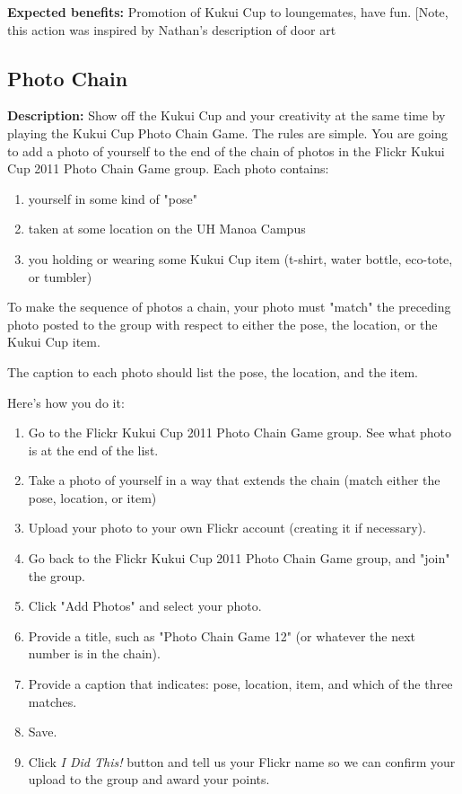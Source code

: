 \vspace{2ex}
\textbf{Expected benefits:} Promotion of Kukui Cup to loungemates, have fun. [Note, this action was inspired by Nathan's description of door art~\cite[pgs. 23--27]{Nathan2005-FreshmanYear}


\subsection{Photo Chain}

\textbf{Description:} Show off the Kukui Cup and your creativity at the same time by playing the Kukui Cup Photo Chain Game. The rules are simple. You are going to add a photo of yourself to the end of the chain of photos in the Flickr Kukui Cup 2011 Photo Chain Game group. Each photo contains:

\begin{enumerate}
	\item yourself in some kind of "pose"
	\item taken at some location on the UH Manoa Campus
	\item you holding or wearing some Kukui Cup item (t-shirt, water bottle, eco-tote, or tumbler)
\end{enumerate}

To make the sequence of photos a chain, your photo must "match" the preceding photo posted to the group with respect to either the pose, the location, or the Kukui Cup item.

The caption to each photo should list the pose, the location, and the item.

Here's how you do it:

\begin{enumerate}
	\item Go to the Flickr Kukui Cup 2011 Photo Chain Game group. See what photo is at the end of the list.
	\item Take a photo of yourself in a way that extends the chain (match either the pose, location, or item)
	\item Upload your photo to your own Flickr account (creating it if necessary).
	\item Go back to the Flickr Kukui Cup 2011 Photo Chain Game group, and "join" the group. 
	\item Click "Add Photos" and select your photo. 
	\item Provide a title, such as "Photo Chain Game 12" (or whatever the next number is in the chain).
	\item Provide a caption that indicates: pose, location, item, and which of the three matches.
	\item Save.
	\item Click \emph{I Did This!} button and tell us your Flickr name so we can confirm your upload to the group and award your points.
\end{enumerate}

